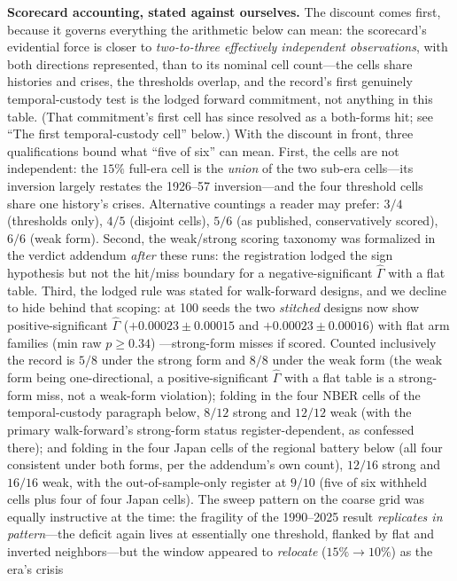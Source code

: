 \documentclass{article}
\begin{document}
\textbf{Scorecard accounting, stated against ourselves.} The
discount comes first, because it governs everything the arithmetic
below can mean: the scorecard's evidential force is closer to
\emph{two-to-three effectively independent observations}, with both
directions represented, than to its nominal cell count---the cells
share histories and crises, the thresholds overlap, and the record's
first genuinely temporal-custody test is the lodged forward
commitment, not anything in this table. (That commitment's first
cell has since resolved as a both-forms hit; see ``The first
temporal-custody cell'' below.) With the discount in front, three
qualifications bound what ``five of six'' can mean. First, the cells
are not independent: the $15\%$ full-era cell is the \emph{union} of
the two sub-era cells---its inversion largely restates the 1926--57
inversion---and the four threshold cells share one history's crises.
Alternative countings a reader may prefer: $3/4$ (thresholds only),
$4/5$ (disjoint cells), $5/6$ (as published, conservatively scored),
$6/6$ (weak form). Second, the weak/strong scoring taxonomy was
formalized in the verdict addendum \emph{after} these runs: the
registration lodged the sign hypothesis but not the hit/miss boundary
for a negative-significant $\hat\Gamma$ with a flat table. Third, the
lodged rule was stated for walk-forward designs, and we decline to
hide behind that scoping: at 100 seeds the two \emph{stitched} designs
now show positive-significant $\hat\Gamma$ ($+0.00023 \pm 0.00015$ and
$+0.00023 \pm 0.00016$) with flat arm families (min raw $p \ge 0.34$)
---strong-form misses if scored. Counted inclusively the record is
$5/8$ under the strong form and $8/8$ under the weak form (the weak
form being one-directional, a positive-significant $\hat\Gamma$ with a
flat table is a strong-form miss, not a weak-form violation); folding in
the four NBER cells of the temporal-custody paragraph below, $8/12$
strong and $12/12$ weak (with the primary walk-forward's strong-form
status register-dependent, as confessed there); and folding in the
four Japan cells of the regional battery below (all four consistent
under both forms, per the addendum's own count), $12/16$ strong and
$16/16$ weak, with the out-of-sample-only register at $9/10$ (five
of six withheld cells plus four of four Japan cells). The sweep pattern on the coarse
grid was equally instructive at the time: the fragility of the
1990--2025 result
\emph{replicates in pattern}---the deficit again lives at essentially
one threshold, flanked by flat and inverted neighbors---but the window
appeared to \emph{relocate} ($15\% \to 10\%$) as the era's crisis
\end{document}
